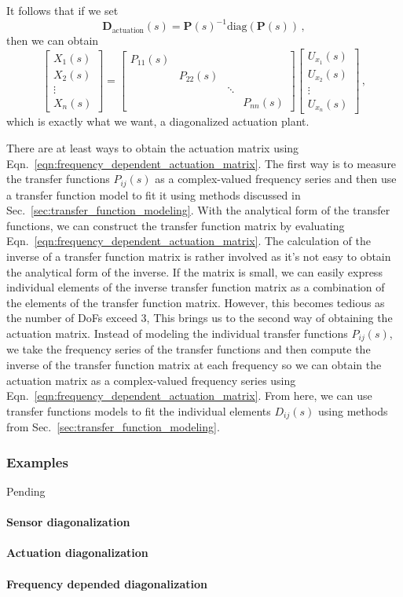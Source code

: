 It follows that if we set
\begin{equation}
	\mathbf{D}_\mathrm{actuation}(s) = \mathbf{P}(s)^{-1}\text{diag}\left(\mathbf{P}(s)\right)\,,
	\label{eqn:frequency_dependent_actuation_matrix}
\end{equation}
then we can obtain
\begin{equation}
	\begin{bmatrix}
		X_1(s)\\
		X_2(s)\\
		\vdots\\
		X_n(s)
	\end{bmatrix}
	=
	\begin{bmatrix}
		P_{11}(s) &  &  & \\
		& P_{22}(s) &  & \\
		&&\ddots&\\
		&&&P_{nn}(s)
	\end{bmatrix}
	\begin{bmatrix}
		U_{x_1}(s)\\
		U_{x_2}(s)\\
		\vdots\\
		U_{x_n}(s)
	\end{bmatrix}
	\,,
\end{equation}
which is exactly what we want, a diagonalized actuation plant.

There are at least ways to obtain the actuation matrix using Eqn.~\eqref{eqn:frequency_dependent_actuation_matrix}.
The first way is to measure the transfer functions $P_{ij}(s)$ as a complex-valued frequency series and then use a transfer function model to fit it using methods discussed in Sec.~\ref{sec:transfer_function_modeling}.
With the analytical form of the transfer functions, we can construct the transfer function matrix by evaluating Eqn.~\eqref{eqn:frequency_dependent_actuation_matrix}.
The calculation of the inverse of a transfer function matrix is rather involved as it's not easy to obtain the analytical form of the inverse.
If the matrix is small, we can easily express individual elements of the inverse transfer function matrix as a combination of the elements of the transfer function matrix.
However, this becomes tedious as the number of DoFs exceed 3,
This brings us to the second way of obtaining the actuation matrix.
Instead of modeling the individual transfer functions $P_{ij}(s)$, we take the frequency series of the transfer functions and then compute the inverse of the transfer function matrix at each frequency so we can obtain the actuation matrix as a complex-valued frequency series using Eqn.~\eqref{eqn:frequency_dependent_actuation_matrix}.
From here, we can use transfer functions models to fit the individual elements $D_{ij}(s)$ using methods from Sec.~\ref{sec:transfer_function_modeling}. 

\subsubsection{Examples}
Pending
\paragraph{Sensor diagonalization}
\paragraph{Actuation diagonalization}
\paragraph{Frequency depended diagonalization}
